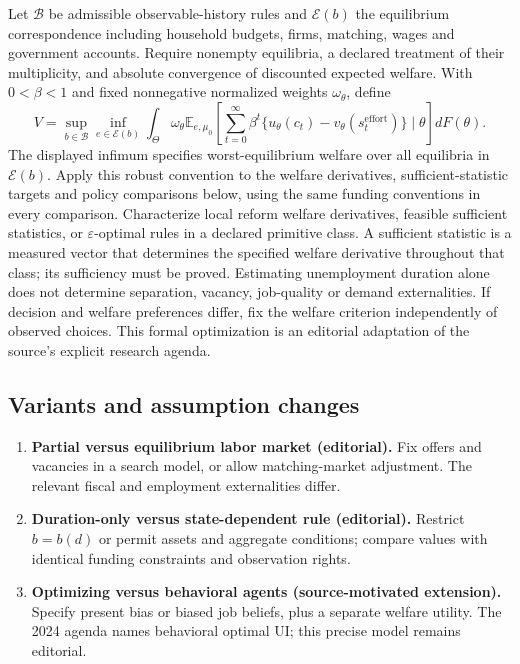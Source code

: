 \documentclass[11pt,a4paper]{article}
\begin{document}
Let \(\mathcal B\) be admissible observable-history rules and \(\mathcal E(b)\) the equilibrium correspondence including household budgets, firms, matching, wages and government accounts. Require nonempty equilibria, a declared treatment of their multiplicity, and absolute convergence of discounted expected welfare. With \(0<\beta<1\) and fixed nonnegative normalized weights \(\omega_\theta\), define
\[
 V=\sup_{b\in\mathcal B}\inf_{e\in\mathcal E(b)}
 \int_\Theta\omega_\theta\mathbb E_{e,\mu_0}\!
 \left[\sum_{t=0}^\infty\beta^t
 \{u_\theta(c_t)-v_\theta(s_t^{\mathrm{effort}})\}\mid\theta\right]dF(\theta).
\]
The displayed infimum specifies worst-equilibrium welfare over all equilibria in \(\mathcal E(b)\). Apply this robust convention to the welfare derivatives, sufficient-statistic targets and policy comparisons below, using the same funding conventions in every comparison. Characterize local reform welfare derivatives, feasible sufficient statistics, or \(\varepsilon\)-optimal rules in a declared primitive class. A sufficient statistic is a measured vector that determines the specified welfare derivative throughout that class; its sufficiency must be proved. Estimating unemployment duration alone does not determine separation, vacancy, job-quality or demand externalities. If decision and welfare preferences differ, fix the welfare criterion independently of observed choices. This formal optimization is an editorial adaptation of the source's explicit research agenda.
\subsection*{Variants and assumption changes}
\begin{enumerate}
\item \textbf{Partial versus equilibrium labor market (editorial).} Fix offers and vacancies in a search model, or allow matching-market adjustment. The relevant fiscal and employment externalities differ.
\item \textbf{Duration-only versus state-dependent rule (editorial).} Restrict \(b=b(d)\) or permit assets and aggregate conditions; compare values with identical funding constraints and observation rights.
\item \textbf{Optimizing versus behavioral agents (source-motivated extension).} Specify present bias or biased job beliefs, plus a separate welfare utility. The 2024 agenda names behavioral optimal UI; this precise model remains editorial.
\end{enumerate}
\end{document}
